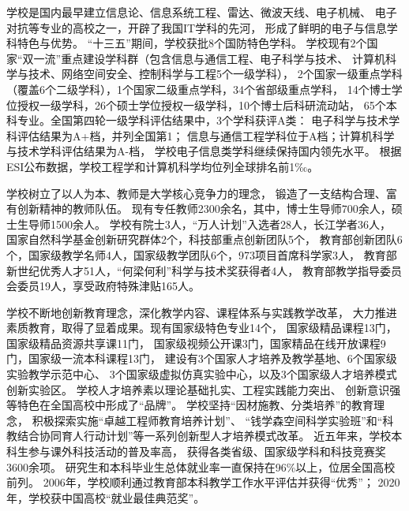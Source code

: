 \par
学校是国内最早建立信息论、信息系统工程、雷达、微波天线、电子机械、
电子对抗等专业的高校之一，开辟了我国IT学科的先河，
形成了鲜明的电子与信息学科特色与优势。
“十三五”期间，学校获批8个国防特色学科。
学校现有2个国家“双一流”重点建设学科群（包含信息与通信工程、电子科学与技术、
计算机科学与技术、网络空间安全、控制科学与工程5个一级学科），
2个国家一级重点学科（覆盖6个二级学科），1个国家二级重点学科，34个省部级重点学科，
14个博士学位授权一级学科，26个硕士学位授权一级学科，10个博士后科研流动站，
65个本科专业。全国第四轮一级学科评估结果中，3个学科获评A类：
电子科学与技术学科评估结果为A+档，并列全国第1；
信息与通信工程学科位于A档；计算机科学与技术学科评估结果为A-档，
学校电子信息类学科继续保持国内领先水平。
根据ESI公布数据，学校工程学和计算机科学均位列全球排名前1‰。
\par
学校树立了以人为本、教师是大学核心竞争力的理念，
锻造了一支结构合理、富有创新精神的教师队伍。
现有专任教师2300余名，其中，博士生导师700余人，硕士生导师1500余人。
学校有院士3人，“万人计划”入选者28人，长江学者36人，
国家自然科学基金创新研究群体2个，科技部重点创新团队5个，
教育部创新团队6个，国家级教学名师4人，国家级教学团队6个，973项目首席科学家3人，
教育部新世纪优秀人才51人，“何梁何利”科学与技术奖获得者4人，
教育部教学指导委员会委员19人，享受政府特殊津贴165人。
\par
学校不断地创新教育理念，深化教学内容、课程体系与实践教学改革，
大力推进素质教育，取得了显着成果。现有国家级特色专业14个，
国家级精品课程13门，国家级精品资源共享课11门，
国家级视频公开课3门，国家精品在线开放课程9门，国家级一流本科课程13门，
建设有3个国家人才培养及教学基地、6个国家级实验教学示范中心、
3个国家级虚拟仿真实验中心，以及3个国家级人才培养模式创新实验区。
学校人才培养素以理论基础扎实、工程实践能力突出、
创新意识强等特色在全国高校中形成了“品牌”。
学校坚持“因材施教、分类培养”的教育理念，
积极探索实施“卓越工程师教育培养计划”、
“钱学森空间科学实验班”和“科教结合协同育人行动计划”等一系列创新型人才培养模式改革。
近五年来，学校本科生参与课外科技活动的普及率高，
获得各类省级、国家级学科和科技竞赛奖3600余项。
研究生和本科毕业生总体就业率一直保持在96\%以上，位居全国高校前列。
2006年，学校顺利通过教育部本科教学工作水平评估并获得“优秀”；
2020年，学校获中国高校“就业最佳典范奖”。
